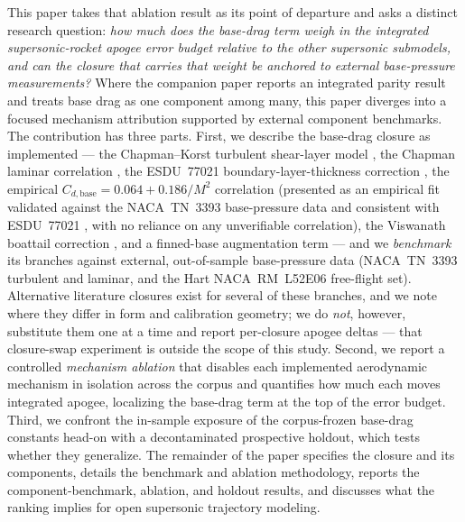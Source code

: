 This paper takes that ablation result as its point of departure and asks a
distinct research question: \emph{how much does the base-drag term weigh in the
integrated supersonic-rocket apogee error budget relative to the other
supersonic submodels, and can the closure that carries that weight be anchored
to external base-pressure measurements?} Where the companion paper
\cite{yu2026jsr} reports an integrated parity result and treats base drag as one
component among many, this paper diverges into a focused mechanism attribution
supported by external component benchmarks. The contribution has three parts.
First, we describe the base-drag closure as implemented --- the Chapman--Korst
turbulent shear-layer model \cite{chapman1955}, the Chapman laminar correlation
\cite{chapman1950}, the ESDU~77021 boundary-layer-thickness correction
\cite{esdu77021}, the empirical $C_{d,\text{base}} = 0.064 + 0.186/M^{2}$
correlation (presented as an empirical fit validated against the NACA~TN~3393
base-pressure data \cite{chapman1955} and consistent with ESDU~77021
\cite{esdu77021}, with no reliance on any unverifiable correlation), the
Viswanath boattail correction \cite{viswanath1996}, and a finned-base
augmentation term --- and we \emph{benchmark} its branches against external,
out-of-sample base-pressure data (NACA~TN~3393 turbulent and laminar, and the
Hart NACA~RM~L52E06 free-flight set). Alternative literature closures exist for
several of these branches, and we note where they differ in form and calibration
geometry; we do \emph{not}, however, substitute them one at a time and report
per-closure apogee deltas --- that closure-swap experiment is outside the scope
of this study. Second, we report a controlled \emph{mechanism ablation} that
disables each implemented aerodynamic mechanism in isolation across the corpus
and quantifies how much each moves integrated apogee, localizing the base-drag
term at the top of the error budget. Third, we confront the in-sample exposure of
the corpus-frozen base-drag constants head-on with a decontaminated prospective
holdout, which tests whether they generalize. The remainder of the paper
specifies the closure and its components, details the benchmark and ablation
methodology, reports the component-benchmark, ablation, and holdout results, and
discusses what the ranking implies for open supersonic trajectory modeling.
